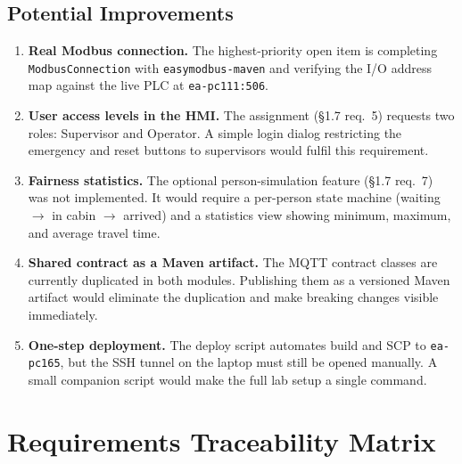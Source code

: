 \documentclass[12pt,a4paper]{article}
\begin{document}
\subsection{Potential Improvements}

\begin{enumerate}
    \item \textbf{Real Modbus connection.}
          The highest-priority open item is completing \texttt{ModbusConnection}
          with \texttt{easymodbus-maven} and verifying the I/O address map
          against the live PLC at \texttt{ea-pc111:506}.

    \item \textbf{User access levels in the HMI.}
          The assignment (§1.7 req.~5) requests two roles: Supervisor and
          Operator. A simple login dialog restricting the emergency and reset
          buttons to supervisors would fulfil this requirement.

    \item \textbf{Fairness statistics.}
          The optional person-simulation feature (§1.7 req.~7) was not
          implemented. It would require a per-person state machine
          (waiting $\to$ in cabin $\to$ arrived) and a statistics view showing
          minimum, maximum, and average travel time.

    \item \textbf{Shared contract as a Maven artifact.}
          The MQTT contract classes are currently duplicated in both modules.
          Publishing them as a versioned Maven artifact would eliminate the
          duplication and make breaking changes visible immediately.

    \item \textbf{One-step deployment.}
          The deploy script automates build and SCP to \texttt{ea-pc165}, but
          the SSH tunnel on the laptop must still be opened manually. A small
          companion script would make the full lab setup a single command.
\end{enumerate}

\appendix
\section{Requirements Traceability Matrix}
\end{document}
